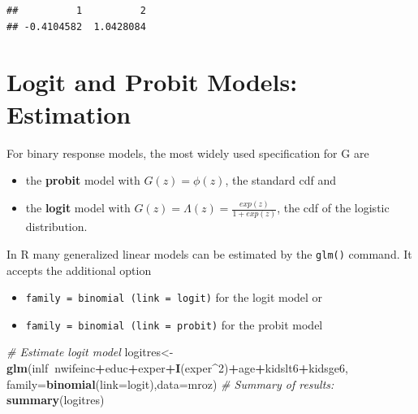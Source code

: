 \documentclass[]{book}
\newenvironment{Shaded}{\begin{snugshade}}{\end{snugshade}}
\newcommand{\CommentTok}[1]{\textcolor[rgb]{0.56,0.35,0.01}{\textit{#1}}}
\newcommand{\DataTypeTok}[1]{\textcolor[rgb]{0.13,0.29,0.53}{#1}}
\newcommand{\DecValTok}[1]{\textcolor[rgb]{0.00,0.00,0.81}{#1}}
\newcommand{\KeywordTok}[1]{\textcolor[rgb]{0.13,0.29,0.53}{\textbf{#1}}}
\newcommand{\NormalTok}[1]{#1}
\newcommand{\OperatorTok}[1]{\textcolor[rgb]{0.81,0.36,0.00}{\textbf{#1}}}
\providecommand{\tightlist}{%
  \setlength{\itemsep}{0pt}\setlength{\parskip}{0pt}}
\begin{document}
\begin{verbatim}
##          1          2 
## -0.4104582  1.0428084
\end{verbatim}

\hypertarget{logit-and-probit-models-estimation}{%
\section{Logit and Probit Models: Estimation}\label{logit-and-probit-models-estimation}}

For binary response models, the most widely used specification for G are

\begin{itemize}
\tightlist
\item
  the \textbf{probit} model with \(G(z) = \phi(z)\), the standard cdf and
\item
  the \textbf{logit} model with \(G(z) = \Lambda(z) = \frac{exp(z)}{1+ exp(z)}\), the cdf of the logistic distribution.
\end{itemize}

In R many generalized linear models can be estimated by the \texttt{glm()} command. It accepts the additional option

\begin{itemize}
\tightlist
\item
  \texttt{family\ =\ binomial\ (link\ =\ logit)} for the logit model or
\item
  \texttt{family\ =\ binomial\ (link\ =\ probit)} for the probit model
\end{itemize}

\begin{Shaded}
\begin{Highlighting}[]
\CommentTok{# Estimate logit model}
\NormalTok{logitres<-}\KeywordTok{glm}\NormalTok{(inlf}\OperatorTok{~}\NormalTok{nwifeinc}\OperatorTok{+}\NormalTok{educ}\OperatorTok{+}\NormalTok{exper}\OperatorTok{+}\KeywordTok{I}\NormalTok{(exper}\OperatorTok{^}\DecValTok{2}\NormalTok{)}\OperatorTok{+}\NormalTok{age}\OperatorTok{+}\NormalTok{kidslt6}\OperatorTok{+}\NormalTok{kidsge6,}
              \DataTypeTok{family=}\KeywordTok{binomial}\NormalTok{(}\DataTypeTok{link=}\NormalTok{logit),}\DataTypeTok{data=}\NormalTok{mroz)}
\CommentTok{# Summary of results:}
\KeywordTok{summary}\NormalTok{(logitres)}
\end{Highlighting}
\end{Shaded}
\end{document}
